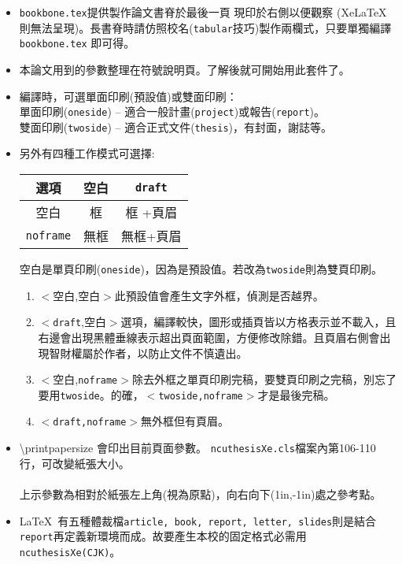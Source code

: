 \begin{itemize}
\item {\tt bookbone.tex}提供製作論文書脊於最後一頁
現印於右側以便觀察 (Xe\LaTeX{}則無法呈現)。長書脊時請仿照校名({\tt tabular}技巧)製作兩欄式，只要單獨編譯{\tt bookbone.tex} 即可得。 
\item 本論文用到的參數整理在符號說明頁\framebox{\pageref{symb}}。了解後就可開始用此套件了。
\item 編譯時，可選單面印刷(預設值)或雙面印刷：\\   %
單面印刷({\tt oneside}) -- 適合一般計畫({\tt project})或報告({\tt report})。\\
雙面印刷({\tt twoside}) -- 適合正式文件({\tt thesis})，有封面，謝誌等。
\item 另外有四種工作模式可選擇:\\ 
  

{\color{blue}
\begin{center}
\begin{tabular}{|c|c|c|} \hline 
 選項          &  空白    &  {\tt  draft}      \\ \hline 
 空白          &    框    &    框 +頁眉      \\ \hline
{\tt noframe}  &    無框  &    無框+頁眉   \\ \hline
\end{tabular}
\end{center}
}
空白是單頁印刷({\tt oneside})，因為是預設值。若改為{\tt twoside}則為雙頁印刷。

\begin{enumerate}
\item $<$空白,空白$>$此預設值會產生文字外框，偵測是否越界。
\item $<${\tt draft},空白$>$選項，編譯較快，圖形或插頁皆以方格表示並不載入，且右邊會出現黑體垂線表示超出頁面範圍，方便修改除錯。且頁眉右側會出現智財權屬於作者，以防止文件不慎遺出。
\item$<$空白,{\tt noframe}$>$除去外框之{\color{red}單頁印刷完稿}，要雙頁印刷之完稿，別忘了要用{\tt twoside}{\color{red}。的確，$<${\tt twoside,noframe}$>$才是最後完稿。}
\item$<${\tt draft,noframe}$>$無外框但有頁眉。
\end{enumerate}
\item \textbackslash printpapersize 會印出目前頁面參數。
{\tt ncuthesisXe.cls}檔案內第106-110行，可改變紙張大小。\\
\printpagesize \\               %
上示參數為相對於紙張左上角(視為原點)，向右向下(1in,-1in)處之參考點。
\item \LaTeX\ 有五種體裁檔{\tt article, book, report, letter, slides}\hfil{}則是結合{\tt report}再定義新環境而成。故要產生本校的固定格式必需用{\tt ncuthesisXe(CJK)}。
\end{itemize}
